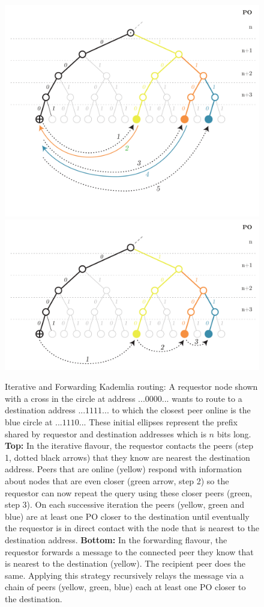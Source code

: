 \begin{figure}[htbp]
   \centering
   \vspace{-2cm} 
   \includegraphics[width=.8\textwidth]{fig/iterative-kademlia.pdf}\\\vspace{-1.3cm}
   \includegraphics[width=.8\textwidth]{fig/forwarding-kademlia-3.pdf}
   \caption[Iterative and Forwarding Kademlia routing \statusgreen]{Iterative and Forwarding Kademlia routing: A requestor node shown with a cross in the circle at address $...0000...$ wants to route to a destination address $...1111...$ to which the closest peer online is the blue circle at $...1110...$ These initial ellipses represent the prefix shared by requestor and destination addresses which is $n$ bits long. \textbf{Top:} In the iterative flavour, the requestor contacts the peers (step 1, dotted black arrows) that they know are nearest the destination address. Peers that are online (yellow) respond with information about nodes that are even closer (green arrow, step 2) so the requestor can now repeat the query using these closer peers (green, step 3). On each successive iteration the peers (yellow, green and blue) are at least one PO closer to the destination until eventually the requestor is in direct contact with the node that is nearest to the destination address. \textbf{Bottom:} In the forwarding flavour, the requestor forwards a message to the connected peer they know that is nearest to the destination (yellow). The recipient peer does the same. Applying this strategy recursively relays the message via a chain of peers (yellow, green, blue) each at least one PO closer to the destination.}
   \label{fig:iterative-forwarding-kademlia}
\end{figure}


